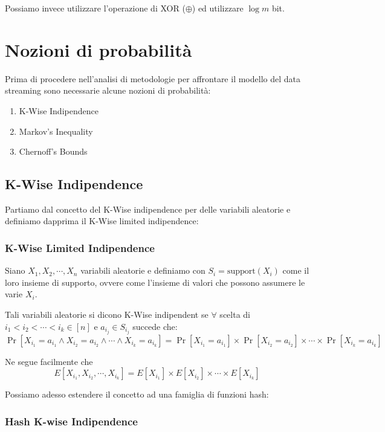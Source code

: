 \documentclass[a4paper,11pt]{book}
\begin{document}
Possiamo invece utilizzare l'operazione di \textsf{XOR} ($\oplus$) ed utilizzare $\log m$ bit.

\section{Nozioni di probabilit\`a}

Prima di procedere nell'analisi di metodologie per affrontare il modello del data streaming sono necessarie alcune nozioni di probabilit\`a:
\begin{enumerate}
\item K-Wise Indipendence
\item Markov's Inequality
\item Chernoff's Bounds
\end{enumerate}

\subsection{K-Wise Indipendence}

Partiamo dal concetto del K-Wise indipendence per delle variabili aleatorie e definiamo dapprima il K-Wise limited indipendence:

\subsubsection{K-Wise Limited Indipendence}

Siano $X_1, X_2, \cdots, X_n$ variabili aleatorie e definiamo con $S_i = \mbox{support}(X_i)$ come il loro insieme di supporto, ovvere come l'insieme di valori che possono assumere le varie $X_i$.

Tali variabili aleatorie si dicono K-Wise indipendent se $\forall$ scelta di $i_1 < i_2 < \cdots < i_k \in [n]$ e $a_{i_j} \in S_{i_j}$ succede che:
$$\Pr[X_{i_1} = a_{i_1} \wedge X_{i_2} = a_{i_2} \wedge \cdots \wedge X_{i_k} = a_{i_k}] = \Pr[X_{i_1} = a_{i_1}] \times \Pr[X_{i_2} = a_{i_2}] \times \cdots \times \Pr[X_{i_k} = a_{i_k}] $$

Ne segue facilmente che $$E[X_{i_1}, X_{i_2}, \cdots, X_{i_k}] = E[X_{i_1}] \times E[X_{i_2}] \times \cdots \times E[X_{i_k}] $$

Possiamo adesso estendere il concetto ad una famiglia di funzioni hash:

\subsubsection{Hash K-wise Indipendence}
\end{document}

